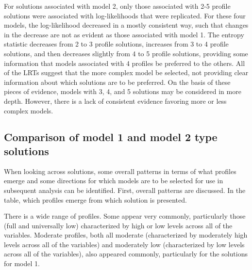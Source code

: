 \documentclass[]{msu-thesis}
\theoremstyle{definition}
\theoremstyle{definition}
\theoremstyle{definition}
\theoremstyle{remark}
\begin{document}
For solutions associated with model 2, only those associated with 2-5
profile solutions were associated with log-likelihoods that were
replicated. For these four models, the log-likelihood decreased in a
mostly consistent way, such that changes in the decrease are not as
evident as those associated with model 1. The entropy statistic
decreases from 2 to 3 profile solutions, increases from 3 to 4 profile
solutions, and then decreases slightly from 4 to 5 profile solutions,
providing some information that models associated with 4 profiles be
preferred to the others. All of the LRTs suggest that the more complex
model be selected, not providing clear information about which solutions
are to be preferred. On the basis of these pieces of evidence, models
with 3, 4, and 5 solutions may be considered in more depth. However,
there is a lack of consistent evidence favoring more or less complex
models.

\subsection{Comparison of model 1 and model 2 type
solutions}\label{comparison-of-model-1-and-model-2-type-solutions}

When looking across solutions, some overall patterns in terms of what
profiles emerge and some directions for which models are to be selected
for use in subsequent analysis can be identified. First, overall
patterns are discussed. In the table, which profiles emerge from which
solution is presented.

There is a wide range of profiles. Some appear very commonly,
particularly those (full and universally low) characterized by high or
low levels across all of the variables. Moderate profiles, both all
moderate (characterized by moderately high levels across all of the
variables) and moderately low (characterized by low levels across all of
the variables), also appeared commonly, particularly for the solutions
for model 1.
\end{document}

